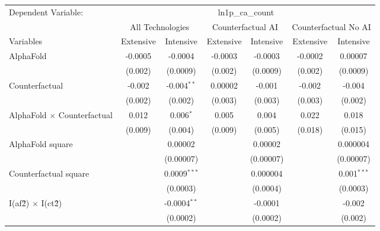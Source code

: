\begingroup
\centering
\begin{tabular}{lcccccc}
   \tabularnewline \midrule \midrule
   Dependent Variable: & \multicolumn{6}{c}{ln1p\_ca\_count}\\
 & \multicolumn{2}{c}{All Technologies} & \multicolumn{2}{c}{Counterfactual AI} & \multicolumn{2}{c}{Counterfactual No AI} \\
\cmidrule(lr){1-1}\cmidrule(lr){2-3} \cmidrule(lr){4-5} \cmidrule(lr){6-7}
Variables & \multicolumn{1}{c}{Extensive} & \multicolumn{1}{c}{Intensive} & \multicolumn{1}{c}{Extensive} & \multicolumn{1}{c}{Intensive} & \multicolumn{1}{c}{Extensive} & \multicolumn{1}{c}{Intensive} \\
\cmidrule(lr){1-1}\cmidrule(lr){2-2} \cmidrule(lr){3-3} \cmidrule(lr){4-4} \cmidrule(lr){5-5} \cmidrule(lr){6-6} \cmidrule(lr){7-7}
   AlphaFold                          & -0.0005 & -0.0004        & -0.0003 & -0.0003   & -0.0002 & 0.00007\\   
                                      & (0.002) & (0.0009)       & (0.002) & (0.0009)  & (0.002) & (0.0009)\\   
   Counterfactual                     & -0.002  & -0.004$^{**}$  & 0.00002 & -0.001    & -0.002  & -0.004\\   
                                      & (0.002) & (0.002)        & (0.003) & (0.003)   & (0.003) & (0.002)\\   
   AlphaFold $\times$ Counterfactual  & 0.012   & 0.006$^{*}$    & 0.005   & 0.004     & 0.022   & 0.018\\   
                                      & (0.009) & (0.004)        & (0.009) & (0.005)   & (0.018) & (0.015)\\   
   AlphaFold square                   &         & 0.00002        &         & 0.00002   &         & 0.000004\\   
                                      &         & (0.00007)      &         & (0.00007) &         & (0.00007)\\   
   Counterfactual square              &         & 0.0009$^{***}$ &         & 0.000004  &         & 0.001$^{***}$\\   
                                      &         & (0.0003)       &         & (0.0004)  &         & (0.0003)\\   
   I(af\^2) $\times$ I(ct\^2)         &         & -0.0004$^{**}$ &         & -0.0001   &         & -0.002\\   
                                      &         & (0.0002)       &         & (0.0002)  &         & (0.002)\\   

\end{tabular}
